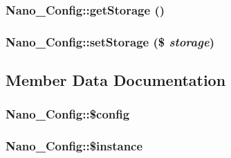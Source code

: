 \hypertarget{classNano__Config_c82ad6325a613816b8e82645d8467db3}{
\subsubsection[{getStorage}]{\setlength{\rightskip}{0pt plus 5cm}Nano\_\-Config::getStorage ()}}
\label{classNano__Config_c82ad6325a613816b8e82645d8467db3}


\hypertarget{classNano__Config_3cbc80940173ab688678e5992815d37d}{
\subsubsection[{setStorage}]{\setlength{\rightskip}{0pt plus 5cm}Nano\_\-Config::setStorage (\$ {\em storage})}}
\label{classNano__Config_3cbc80940173ab688678e5992815d37d}




\subsection{Member Data Documentation}
\hypertarget{classNano__Config_8f77d6434e226b0493188a9c583c845b}{
\subsubsection[{\$config}]{\setlength{\rightskip}{0pt plus 5cm}Nano\_\-Config::\$config}}
\label{classNano__Config_8f77d6434e226b0493188a9c583c845b}


\hypertarget{classNano__Config_1631ccf8dc16c6c4e55ef31657d46c7e}{
\subsubsection[{\$instance}]{\setlength{\rightskip}{0pt plus 5cm}Nano\_\-Config::\$instance}}
\label{classNano__Config_1631ccf8dc16c6c4e55ef31657d46c7e}


